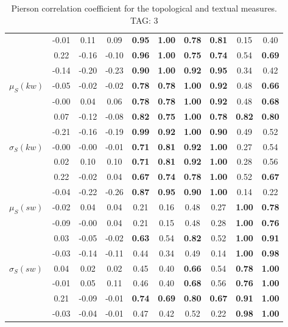 \begin{table*}[h!]
\begin{center}
\begin{tabular}{| l || c | c | c | c | c | c | c | c | c |}
 & -0.01 & 0.11 & 0.09 & {\bf 0.95} & {\bf 1.00} & {\bf 0.78} & {\bf 0.81} & 0.15 & 0.40 \\
 & 0.22 & -0.16 & -0.10 & {\bf 0.96} & {\bf 1.00} & {\bf 0.75} & {\bf 0.74} & 0.54 & {\bf 0.69} \\
 & -0.14 & -0.20 & -0.23 & {\bf 0.90} & {\bf 1.00} & {\bf 0.92} & {\bf 0.95} & 0.34 & 0.42 \\\hline
$\mu_S(kw)$ & -0.05 & -0.02 & -0.02 & {\bf 0.78} & {\bf 0.78} & {\bf 1.00} & {\bf 0.92} & 0.48 & {\bf 0.66} \\
 & -0.00 & 0.04 & 0.06 & {\bf 0.78} & {\bf 0.78} & {\bf 1.00} & {\bf 0.92} & 0.48 & {\bf 0.68} \\
 & 0.07 & -0.12 & -0.08 & {\bf 0.82} & {\bf 0.75} & {\bf 1.00} & {\bf 0.78} & {\bf 0.82} & {\bf 0.80} \\
 & -0.21 & -0.16 & -0.19 & {\bf 0.99} & {\bf 0.92} & {\bf 1.00} & {\bf 0.90} & 0.49 & 0.52 \\\hline
$\sigma_S(kw)$ & -0.00 & -0.00 & -0.01 & {\bf 0.71} & {\bf 0.81} & {\bf 0.92} & {\bf 1.00} & 0.27 & 0.54 \\
 & 0.02 & 0.10 & 0.10 & {\bf 0.71} & {\bf 0.81} & {\bf 0.92} & {\bf 1.00} & 0.28 & 0.56 \\
 & 0.22 & -0.02 & 0.04 & {\bf 0.67} & {\bf 0.74} & {\bf 0.78} & {\bf 1.00} & 0.52 & {\bf 0.67} \\
 & -0.04 & -0.22 & -0.26 & {\bf 0.87} & {\bf 0.95} & {\bf 0.90} & {\bf 1.00} & 0.14 & 0.22 \\\hline
$\mu_S(sw)$ & -0.02 & 0.04 & 0.04 & 0.21 & 0.16 & 0.48 & 0.27 & {\bf 1.00} & {\bf 0.78} \\
 & -0.09 & -0.00 & 0.04 & 0.21 & 0.15 & 0.48 & 0.28 & {\bf 1.00} & {\bf 0.76} \\
 & 0.03 & -0.05 & -0.02 & {\bf 0.63} & 0.54 & {\bf 0.82} & 0.52 & {\bf 1.00} & {\bf 0.91} \\
 & -0.03 & -0.14 & -0.11 & 0.44 & 0.34 & 0.49 & 0.14 & {\bf 1.00} & {\bf 0.98} \\\hline
$\sigma_S(sw)$ & 0.04 & 0.02 & 0.02 & 0.45 & 0.40 & {\bf 0.66} & 0.54 & {\bf 0.78} & {\bf 1.00} \\
 & -0.01 & 0.05 & 0.11 & 0.46 & 0.40 & {\bf 0.68} & 0.56 & {\bf 0.76} & {\bf 1.00} \\
 & 0.21 & -0.09 & -0.01 & {\bf 0.74} & {\bf 0.69} & {\bf 0.80} & {\bf 0.67} & {\bf 0.91} & {\bf 1.00} \\
 & -0.03 & -0.04 & -0.01 & 0.47 & 0.42 & 0.52 & 0.22 & {\bf 0.98} & {\bf 1.00} \\\hline
\end{tabular}
\caption{Pierson correlation coefficient for the topological and textual measures. TAG: 3}
\end{center}
\end{table*}